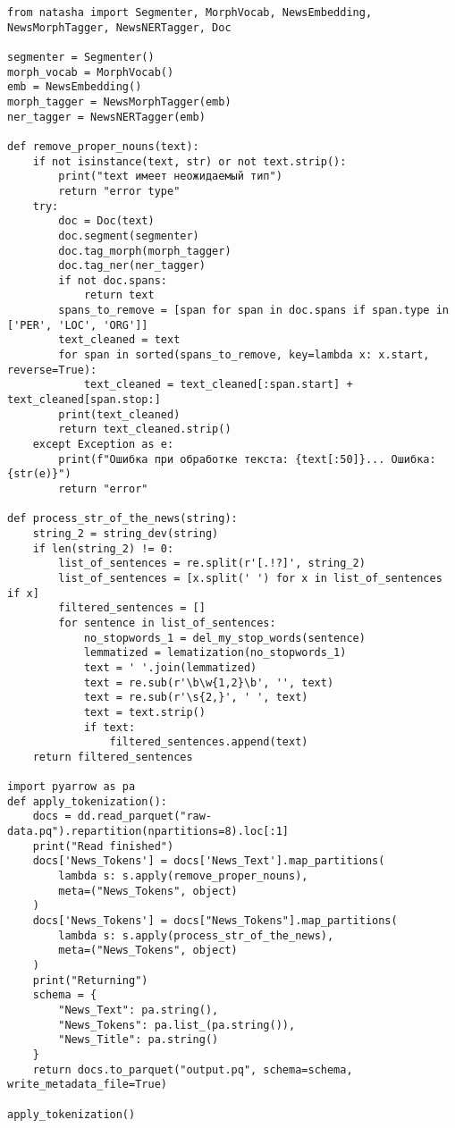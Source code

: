 \documentclass[coursework]{SCWorks}
\begin{document}
\begin{verbatim}
from natasha import Segmenter, MorphVocab, NewsEmbedding, NewsMorphTagger, NewsNERTagger, Doc

segmenter = Segmenter()
morph_vocab = MorphVocab()
emb = NewsEmbedding()
morph_tagger = NewsMorphTagger(emb)
ner_tagger = NewsNERTagger(emb)

def remove_proper_nouns(text):
    if not isinstance(text, str) or not text.strip():
        print("text имеет неожидаемый тип")
        return "error type"
    try:
        doc = Doc(text)
        doc.segment(segmenter)
        doc.tag_morph(morph_tagger)
        doc.tag_ner(ner_tagger)
        if not doc.spans:
            return text
        spans_to_remove = [span for span in doc.spans if span.type in ['PER', 'LOC', 'ORG']]
        text_cleaned = text
        for span in sorted(spans_to_remove, key=lambda x: x.start, reverse=True):
            text_cleaned = text_cleaned[:span.start] + text_cleaned[span.stop:]
        print(text_cleaned)
        return text_cleaned.strip()
    except Exception as e:
        print(f"Ошибка при обработке текста: {text[:50]}... Ошибка: {str(e)}")
        return "error"

def process_str_of_the_news(string):
    string_2 = string_dev(string)
    if len(string_2) != 0:
        list_of_sentences = re.split(r'[.!?]', string_2)
        list_of_sentences = [x.split(' ') for x in list_of_sentences if x]
        filtered_sentences = []
        for sentence in list_of_sentences:
            no_stopwords_1 = del_my_stop_words(sentence)
            lemmatized = lematization(no_stopwords_1)
            text = ' '.join(lemmatized)
            text = re.sub(r'\b\w{1,2}\b', '', text)
            text = re.sub(r'\s{2,}', ' ', text)
            text = text.strip()
            if text:
                filtered_sentences.append(text)
    return filtered_sentences

import pyarrow as pa
def apply_tokenization():
    docs = dd.read_parquet("raw-data.pq").repartition(npartitions=8).loc[:1]
    print("Read finished")
    docs['News_Tokens'] = docs['News_Text'].map_partitions(
        lambda s: s.apply(remove_proper_nouns),
        meta=("News_Tokens", object)
    )
    docs['News_Tokens'] = docs["News_Tokens"].map_partitions(
        lambda s: s.apply(process_str_of_the_news),
        meta=("News_Tokens", object)
    )
    print("Returning")
    schema = {
        "News_Text": pa.string(),
        "News_Tokens": pa.list_(pa.string()),
        "News_Title": pa.string()
    }
    return docs.to_parquet("output.pq", schema=schema, write_metadata_file=True)

apply_tokenization()
\end{verbatim}
\end{document}
